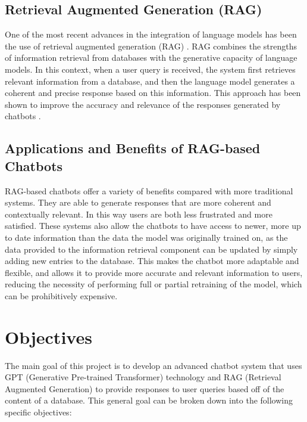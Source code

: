 \documentclass[a4paper,12pt,twoside]{ThesisStyle}
\begin{document}
\section{Retrieval Augmented Generation (RAG)}
\label{sec:rag}

One of the most recent advances in the integration of language models has been the use of retrieval augmented generation (RAG) \cite{Lewis2021RetrievalAugmentedGeneration}. RAG combines the strengths of information retrieval from databases with the generative capacity of language models. In this context, when a user query is received, the system first retrieves relevant information from a database, and then the language model generates a coherent and precise response based on this information. This approach has been shown to improve the accuracy and relevance of the responses generated by chatbots \cite{Lewis2021RetrievalAugmentedGeneration}.

\section{Applications and Benefits of RAG-based Chatbots}
\label{sec:applications}

RAG-based chatbots offer a variety of benefits compared with more traditional systems. They are able to generate responses that are more coherent and contextually relevant. In this way users are both less frustrated and more satisfied. These systems also allow the chatbots to have access to newer, more up to date information than the data the model was originally trained on, as the data provided to the information retrieval component can be updated by simply adding new entries to the database. This makes the chatbot more adaptable and flexible, and allows it to provide more accurate and relevant information to users, reducing the necessity of performing full or partial retraining of the model, which can be prohibitively expensive.

\chapter{Objectives}
\label{cap:objectives}

The main goal of this project is to develop an advanced chatbot system that uses GPT (Generative Pre-trained Transformer) technology and RAG (Retrieval Augmented Generation) to provide responses to user queries based off of the content of a database. This general goal can be broken down into the following specific objectives:
\end{document}
